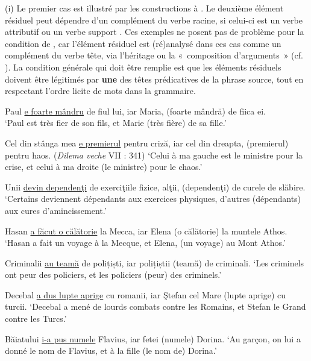(i) Le premier cas est illustré par les constructions à . Le deuxième élément résiduel peut dépendre d’un complément du verbe racine, si celui-ci est un verbe attributif  ou un verbe support . Ces exemples ne posent pas de problème pour la condition de , car l’élément résiduel est (ré)analysé dans ces cas comme un complément du verbe tête, via l’héritage ou la «~composition d’arguments~» (cf. \citealt{AbeilleEtAl2003a}). La condition générale qui doit être remplie est que les éléments résiduels doivent être légitimés par \textbf{une} des têtes prédicatives de la phrase source, tout en respectant l’ordre licite de mots dans la grammaire.

\ea \label{ch2:ex121}
\ea Paul \uline{e foarte mândru} de fiul lui, iar Maria, (foarte mândră) de fiica ei.\\
\glt ‘Paul est très fier de son fils, et Marie (très fière) de sa fille.’   

\ex Cel din stânga mea \uline{e premierul} pentru criză, iar cel din dreapta, (premierul) pentru haos. (\textit{Dilema veche} VII : 341)
\glt ‘Celui à ma gauche est le ministre pour la crise, et celui à ma droite (le ministre) pour le chaos.’

\newpage 
\ex Unii \uline{devin dependenţi} de exerciţiile fizice, alţii, (dependenţi) de curele de slăbire.
\glt ‘Certains deviennent dépendants aux exercices physiques, d’autres (dépendants) aux cures d’amincissement.’
\z
\z


\ea \label{ch2:ex122}
\ea Hasan \uline{a făcut o călătorie} la Mecca, iar Elena (o călătorie) la muntele Athos.
\glt  ‘Hasan a fait un voyage à la Mecque, et Elena, (un voyage) au Mont Athos.’   

\ex  Criminalii \uline{au teamă} de polițiști, iar polițiștii (teamă) de criminali.
\glt  ‘Les criminels ont peur des policiers, et les policiers (peur) des criminels.’

\ex  Decebal \uline{a dus lupte aprige} cu romanii, iar Ştefan cel Mare (lupte aprige) cu turcii.
\glt  ‘Decebal a mené de lourds combats contre les Romains, et Stefan le Grand contre les Turcs.’

\ex  Băiatului \uline{i-a pus numele} Flavius, iar fetei (numele) Dorina.
\glt  ‘Au garçon, on lui a donné le nom de Flavius, et à la fille (le nom de) Dorina.’
\z
\z

